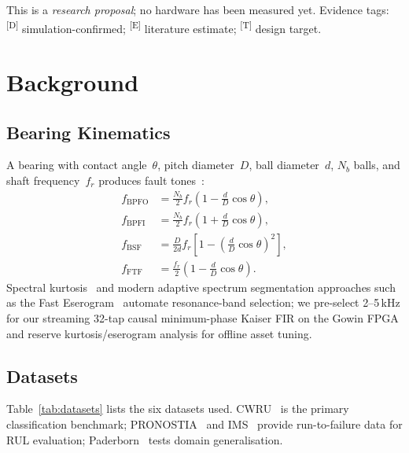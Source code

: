 \documentclass[conference]{IEEEtran}
\newcommand{\evD}{\textsuperscript{\textcolor{derived}{[D]}}\xspace}
\newcommand{\evE}{\textsuperscript{\textcolor{estimated}{[E]}}\xspace}
\newcommand{\evT}{\textsuperscript{\textcolor{target}{[T]}}\xspace}
\begin{document}
This is a \emph{research proposal}; no hardware has been measured yet.
Evidence tags: \evD simulation-confirmed; \evE literature estimate;
\evT design target.

\section{Background}
\label{sec:background}

\subsection{Bearing Kinematics}
\label{sec:kin}

A bearing with contact angle~$\theta$, pitch diameter~$D$, ball
diameter~$d$, $N_b$ balls, and shaft frequency~$f_r$ produces
fault tones~\cite{mcfadden1984model}:
\begin{align}
  f_\mathrm{BPFO} &=
    \tfrac{N_b}{2}f_r\!\left(1-\tfrac{d}{D}\cos\theta\right),
    \label{eq:bpfo}\\
  f_\mathrm{BPFI} &=
    \tfrac{N_b}{2}f_r\!\left(1+\tfrac{d}{D}\cos\theta\right),
    \label{eq:bpfi}\\
  f_\mathrm{BSF} &=
    \tfrac{D}{2d}f_r\!
    \left[1-\!\left(\tfrac{d}{D}\cos\theta\right)^{\!2}\right],
    \label{eq:bsf}\\
  f_\mathrm{FTF} &=
    \tfrac{f_r}{2}\!\left(1-\tfrac{d}{D}\cos\theta\right).
    \label{eq:ftf}
\end{align}
Spectral kurtosis~\cite{antoni2006spectral} and modern adaptive spectrum segmentation
approaches such as the Fast Eserogram~\cite{zhang2025eserogram} automate resonance-band
selection; we pre-select 2--5\,kHz for our streaming 32-tap causal minimum-phase Kaiser FIR
on the Gowin FPGA and reserve kurtosis/eserogram analysis for offline asset tuning.

\subsection{Datasets}
\label{sec:datasets}

Table~\ref{tab:datasets} lists the six datasets used.
CWRU~\cite{cwru2000dataset} is the primary classification benchmark;
PRONOSTIA~\cite{nectoux2012pronostia} and IMS~\cite{ims2003dataset}
provide run-to-failure data for RUL evaluation;
Paderborn~\cite{lessmeier2016condition} tests domain generalisation.
\end{document}
